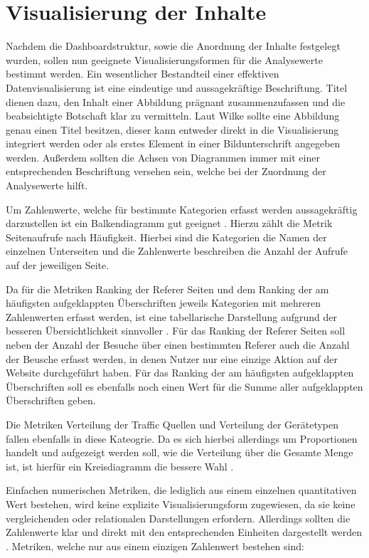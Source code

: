 \section{Visualisierung der Inhalte}
\label{sec:Visualisierungsmethoden}
Nachdem die Dashboardstruktur, sowie die Anordnung der Inhalte festgelegt wurden, sollen nun geeignete Visualisierungsformen für die Analysewerte bestimmt werden. 
Ein wesentlicher Bestandteil einer effektiven Datenvisualisierung ist eine eindeutige und aussagekräftige Beschriftung. Titel dienen dazu, den Inhalt einer Abbildung prägnant zusammenzufassen und die beabsichtigte Botschaft klar zu vermitteln. Laut Wilke sollte eine Abbildung genau einen Titel besitzen, dieser kann entweder direkt in die Visualisierung integriert werden oder als erstes Element in einer Bildunterschrift angegeben werden. Außerdem sollten die Achsen von Diagrammen immer mit einer entsprechenden Beschriftung versehen sein, welche bei der Zuordnung der Analysewerte hilft. \parencite[Kap.22]{Wilke}

Um Zahlenwerte, welche für bestimmte Kategorien erfasst werden aussagekräftig darzustellen ist ein Balkendiagramm gut geeignet \parencite[Kap.5]{Wilke}. Hierzu zählt die Metrik \glqq Seitenaufrufe nach Häufigkeit\grqq{}. Hierbei sind die Kategorien die Namen der einzelnen Unterseiten und die Zahlenwerte beschreiben die Anzahl der Aufrufe auf der jeweiligen Seite.

Da für die Metriken \glqq Ranking der Referer Seiten\grqq{} und dem \glqq Ranking der am häufigsten aufgeklappten Überschriften\grqq{} jeweils Kategorien mit mehreren Zahlenwerten erfasst werden, ist eine tabellarische Darstellung aufgrund der besseren Übersichtlichkeit sinnvoller \parencite{Auditrium}. Für das \glqq Ranking der Referer Seiten\grqq{} soll neben der Anzahl der Besuche über einen bestimmten Referer auch die Anzahl der Beusche erfasst werden, in denen Nutzer nur eine einzige Aktion auf der Website durchgeführt haben. Für das \glqq Ranking der am häufigsten aufgeklappten Überschriften \grqq{} soll es ebenfalls noch einen Wert für die Summe aller aufgeklappten Überschriften geben.

Die Metriken \glqq Verteilung der Traffic Quellen\grqq{} und \glqq Verteilung der Gerätetypen\grqq{} fallen ebenfalls in diese Kateogrie. Da es sich hierbei allerdings um Proportionen handelt und aufgezeigt werden soll, wie die Verteilung über die Gesamte Menge ist, ist hierfür ein Kreisdiagramm die bessere Wahl \parencite[Kap.5]{Wilke}.

Einfachen numerischen Metriken, die lediglich aus einem einzelnen quantitativen Wert bestehen, wird keine explizite Visualisierungsform zugewiesen, da sie keine vergleichenden oder relationalen Darstellungen erfordern. Allerdings sollten die Zahlenwerte klar und direkt mit den entsprechenden Einheiten dargestellt werden \parencite[Kap.22]{Wilke}. Metriken, welche nur aus einem einzigen Zahlenwert bestehen sind: 

